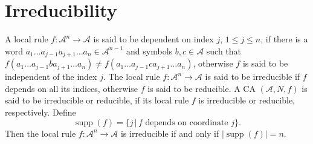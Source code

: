 \documentclass[a4paper]{article}
\newcommand{\supp}{\mathop{\mathrm{supp}}}
\begin{document}
\section{Irreducibility}
\label{sec:irr}
A local rule $f : \mathcal{A}^n \to \mathcal{A}$ is said to be dependent on index $j$, $1 \le j \le n$,
if there is a word $a_1\ldots a_{j-1}a_{j+1}\ldots a_{n} \in \mathcal{A}^{n-1}$ and
symbols $b, c \in \mathcal{A}$ such that
$f(a_1\ldots a_{j-1}ba_{j+1}\ldots a_{n}) \ne f(a_1\ldots a_{j-1}ca_{j+1}\ldots a_{n})$,
otherwise $f$ is said to be independent of the index $j$.
The local rule $f: \mathcal{A}^n \to \mathcal{A}$ is said to be irreducible
if $f$ depends on all its indices, otherwise
$f$ is said to be reducible.
A CA $(\mathcal{A}, N, f)$ is said to be irreducible or reducible, if its local rule $f$ is
irreducible or reducible, respectively.
Define
 \[
\supp(f) = \{ j \, | \, \mbox{$f$ depends on coordinate $j$} \}.
\]
Then the local rule $f: \mathcal{A}^n \to \mathcal{A}$ is irreducible if and only if
$|\supp(f)| = n$.
\end{document}

